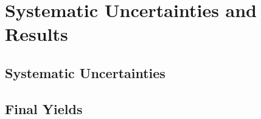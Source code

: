 \chapter{Systematic Uncertainties and Results}

\label{ch:results}

\section{Systematic Uncertainties}


\section{Final Yields}

